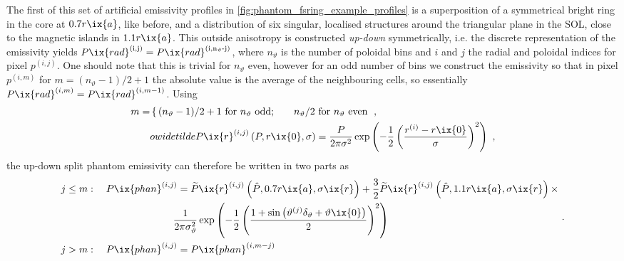 %
            The first of this set of artificial emissivity profiles in \cref{fig:phantom_fsring_example_profiles} is a superposition of a symmetrical bright ring in the core at $0.7r\ix{a}$, like before, and a distribution of six singular, localised structures around the triangular plane in the SOL, close to the magnetic islands in $1.1r\ix{a}$. This outside anisotropy is constructed \textit{up-down} symmetrically, i.e. the discrete representation of the emissivity yields $P\ix{rad}^{\left(\text{i,j}\right)}=P\ix{rad}^{\left(\text{i,n$_{\vartheta}$-j}\right)}$, where $n_{\vartheta}$ is the number of poloidal bins and $i$ and $j$ the radial and poloidal indices for pixel $p^{\left(i,j\right)}$. One should note that this is trivial for $n_{\vartheta}$ even, however for an odd number of bins we construct the emissivity so that in pixel $p^{\left(i,m\right)}$ for $m=(n_{\vartheta}-1)/2+1$ the absolute value is the average of the neighbouring cells, so essentially $P\ix{rad}^{\left(i,m\right)}=P\ix{rad}^{\left(i,m-1\right)}$. Using%
%
            \begin{align}%
                m=&\left\{\,(n_{\vartheta}-1)/2+1\,\,\text{for }n_{\vartheta}\text{ odd;}\qquad n_{\vartheta}/2\,\,\text{for }n_{\vartheta}\text{ even}\right.\,\,,\nonumber\\%
                &owidetilde{P}\ix{r}^{\left(i,j\right)}\left(P,r\ix{0},\sigma\right)=\frac{P}{2\pi\sigma^{2}}\exp\left(-\frac{1}{2}\left(\frac{r^{\left(i\right)}-r\ix{0}}{\sigma}\right)^{2}\right)\,\,,\nonumber%
            \end{align}%
%
            the up-down split phantom emissivity can therefore be written in two parts as%
%
            \begin{align}
                \begin{split}\label{eq:prad_anisym}%
                    j\leq m&:\quad P\ix{phan}^{\left(i,j\right)}=%
                        \widetilde{P}\ix{r}^{\left(i,j\right)}\left(\hat{P},0.7r\ix{a},\sigma\ix{r}\right)+\frac{3}{2}\widetilde{P}\ix{r}^{\left(i,j\right)}\left(\hat{P},1.1r\ix{a},\sigma\ix{r}\right)\times\\%
                        &\hspace*{3cm}\frac{1}{2\pi\sigma_{\vartheta}^{2}}\exp\left(-\frac{1}{2}\left(\frac{1+\sin\left(\vartheta^{\left(j\right)}\delta_{\vartheta}+\vartheta\ix{0}\right)}{2}\right)^{2}\right)\\%
                    j>m&:\quad P\ix{phan}^{\left(i,j\right)}=P\ix{phan}^{\left(i,m-j\right)}%
                \end{split}\,\,.%
            \end{align}%
